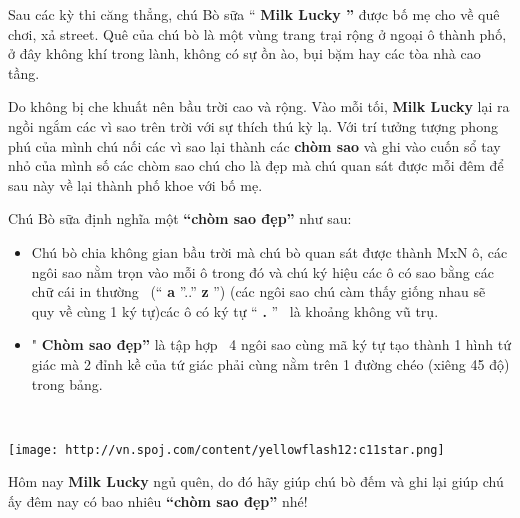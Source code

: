 Sau các kỳ thi căng thẳng, chú Bò sữa “ \textbf{ Milk Lucky ” } được bố mẹ cho về quê chơi, xả street. Quê của chú bò là một vùng trang trại rộng ở ngoại ô thành phố, ở đây không khí trong lành, không có sự ồn ào, bụi bặm hay các tòa nhà cao tầng.

Do không bị che khuất nên bầu trời cao và rộng. Vào mỗi tối, \textbf{ Milk Lucky } lại ra ngồi ngắm các vì sao trên trời với sự thích thú kỳ lạ. Với trí tưởng tượng phong phú của mình chú nối các vì sao lại thành các \textbf{ chòm sao } và ghi vào cuốn sổ tay nhỏ của mình số các chòm sao chú cho là đẹp mà chú quan sát được mỗi đêm để sau này về lại thành phố khoe với bố mẹ.

Chú Bò sữa định nghĩa một \textbf{“chòm sao đẹp”} như sau:
\begin{itemize}
	\item Chú bò chia không gian bầu trời mà chú bò quan sát được thành MxN ô, các ngôi sao nằm trọn vào mỗi ô trong đó và chú ký hiệu các ô có sao bằng các chữ cái in thường  (“ \textbf{ a } ”..” \textbf{ z } ”) (các ngôi sao chú càm thấy giống nhau sẽ quy về cùng 1 ký tự)các ô có ký tự “ \textbf{ . } ”  là khoảng không vũ trụ.
	\item " \textbf{Chòm sao đẹp”} là tập hợp  4 ngôi sao cùng mã ký tự tạo thành 1 hình tứ giác mà 2 đỉnh kề của tứ giác phải cùng nằm trên 1 đường chéo (xiêng 45 độ) trong bảng.
\end{itemize}

 


\texttt{[image: http://vn.spoj.com/content/yellowflash12:c11star.png]}

Hôm nay \textbf{Milk Lucky} ngủ quên, do đó hãy giúp chú bò đếm và ghi lại giúp chú ấy đêm nay có bao nhiêu \textbf{“chòm sao đẹp”} nhé!
\begin{itemize}
\end{itemize}